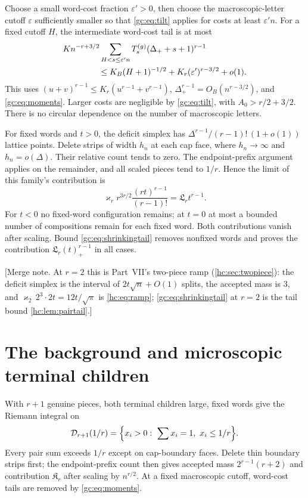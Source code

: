 \documentclass[11pt,a4paper]{article}
\theoremstyle{definition}\newaliascnt{definition}{theorem}
\theoremstyle{remark}\newaliascnt{remark}{theorem}
\newcommand{\prpos}[1]{(#1)_+}
\begin{document}
Choose a small word-cost fraction $\varepsilon'>0$, then choose the
macroscopic-letter cutoff $\varepsilon$ sufficiently smaller so that
\eqref{gc:eq:tilt} applies for costs at least $\varepsilon'n$. For a fixed
cutoff $H$, the intermediate word-cost tail is at most
\begin{align}
 &K n^{-r+3/2}\sum_{H<s\le\varepsilon'n}
       T^{(g)}_s(\Delta_++s+1)^{r-1}\notag\\
 &\hspace{15mm}\le K_B(H+1)^{-1/2}
                  +K_r(\varepsilon')^{r-3/2}+o(1).\label{gc:eq:shrinkingtail}
\end{align}
This uses $(u+v)^{r-1}\le K_r(u^{r-1}+v^{r-1})$,
$\Delta_+^{r-1}=O_B(n^{r-3/2})$, and \eqref{gc:eq:moments}. Larger costs are
negligible by \eqref{gc:eq:tilt}, with $A_0>r/2+3/2$. There is no circular
dependence on the number of macroscopic letters.

For fixed words and $t>0$, the deficit simplex has
$\Delta^{r-1}/(r-1)!\,(1+o(1))$ lattice points. Delete strips of width $h_n$ at
each cap face, where $h_n\to\infty$ and $h_n=o(\Delta)$. Their relative count
tends to zero. The endpoint-prefix argument applies on the remainder, and all
scaled pieces tend to $1/r$. Hence the limit of this family's contribution is
\[
 \varkappa_rr^{3r/2}\frac{(rt)^{r-1}}{(r-1)!}
 =\mathfrak L_rt^{r-1}.
\]
For $t<0$ no fixed-word configuration remains; at $t=0$ at most a bounded
number of compositions remain for each fixed word. Both contributions vanish
after scaling. Bound \eqref{gc:eq:shrinkingtail} removes nonfixed words and
proves the contribution $\mathfrak L_r\prpos t^{r-1}$ in all cases.

[Merge note. At $r=2$ this is Part~VII's two-piece ramp
(\cref{hc:sec:twopiece}): the deficit simplex is the interval of $2t\sqrt n+O(1)$
splits, the accepted mass is $3$, and $\varkappa_2\,2^3\cdot2t=12t/\sqrt\pi$ is
\eqref{hc:eq:ramp}; \eqref{gc:eq:shrinkingtail} at $r=2$ is the tail bound
\cref{hc:lem:pairtail}.]

\section{The background and microscopic terminal children}
\label{gc:sec:background}
With $r+1$ genuine pieces, both terminal children large, fixed words give the
Riemann integral on
\[
 \mathcal D_{r+1}(1/r)=\Bigl\{x_i>0:\ \sum x_i=1,\ x_i\le1/r\Bigr\}.
\]
Every pair sum exceeds $1/r$ except on cap-boundary faces. Delete thin boundary
strips first; the endpoint-prefix count then gives accepted mass
$2^{r-1}(r+2)$ and contribution $\mathfrak K_r$ after scaling by $n^{r/2}$. At
a fixed macroscopic cutoff, word-cost tails are removed by
\eqref{gc:eq:moments}.
\end{document}
